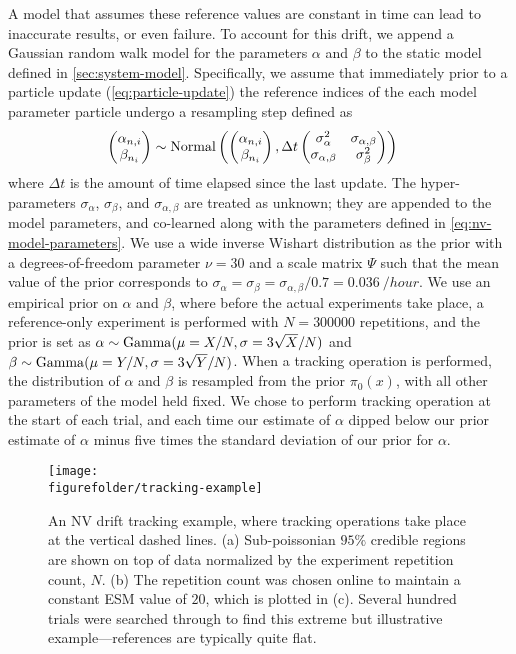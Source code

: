 \documentclass[aps,nofootinbib,twocolumn,superscriptaddress]{revtex4}
\newcommand{\figurefolder}{../fig}
\newcommand{\mps}{x}
\begin{document}
A model that assumes these reference values are constant 
in time can lead to inaccurate results, or even failure.
To account for this drift, 
we append a Gaussian random
walk model for the parameters $\alpha$ and $\beta$ to the static
model defined in \autoref{sec:system-model}.
Specifically, we assume that immediately prior to 
a particle update (\autoref{eq:particle-update}) the reference
indices of the each model parameter particle
undergo a resampling step defined as
\begin{align}
    \begin{pmatrix}\alpha_{n,i}\\\beta_{n_i}\end{pmatrix}
        &\sim \operatorname{Normal}\left(
            \begin{pmatrix}\alpha_{n,i}\\\beta_{n_i}\end{pmatrix},
            \Delta t 
            \begin{pmatrix}\sigma_\alpha^2&\sigma_{\alpha,\beta}\\\sigma_{\alpha,\beta}&\sigma_\beta^2\end{pmatrix}
            \right)
\end{align}
where $\Delta t$ is the amount of time elapsed since the last
update.
The hyper-parameters $\sigma_\alpha$, $\sigma_\beta$, and 
$\sigma_{\alpha,\beta}$ are treated as unknown; they are appended to
the model parameters, and co-learned along with the parameters defined
in \autoref{eq:nv-model-parameters}.
We use a wide inverse Wishart distribution as the prior with a 
degrees-of-freedom parameter $\nu=30$ and a scale matrix $\Psi$
such that the mean value of the prior corresponds to
$\sigma_\alpha=\sigma_\beta=\sigma_{\alpha,\beta}/0.7=\SI{0.036}{/hour}$.
We use an empirical prior on $\alpha$ and $\beta$, where before
the actual experiments take place, a reference-only experiment is performed with $N=300000$ repetitions, and the prior 
is set as $\alpha\sim\operatorname{Gamma}(\mu=X/N,\sigma=3\sqrt{X}/N)$
and $\beta\sim\operatorname{Gamma}(\mu=Y/N,\sigma=3\sqrt{Y}/N)$.
When a tracking operation is performed, the distribution of 
$\alpha$ and $\beta$ is resampled from the prior $\pi_0(\mps)$,
with all other parameters of the model held fixed.
We chose to perform tracking operation at the start of each trial,
and each time our estimate of $\alpha$ dipped below
our prior estimate of $\alpha$ minus five times the standard
deviation of our prior for $\alpha$.


\begin{figure}
    \centering
    \texttt{[image: \\figurefolder/tracking-example]}
    \caption{An NV drift tracking example, where tracking 
    operations take place at the vertical dashed lines.
    (a) Sub-poissonian $95\%$ credible regions are shown on top of data
    normalized by the experiment repetition count, $N$.
    (b) The repetition count was chosen online to maintain a
    constant ESM value of $20$, which is plotted in (c).
    Several hundred trials were searched through
    to find this extreme but illustrative example---references are typically
    quite flat.}
    \label{fig:tracking-example}
\end{figure}
\end{document}
